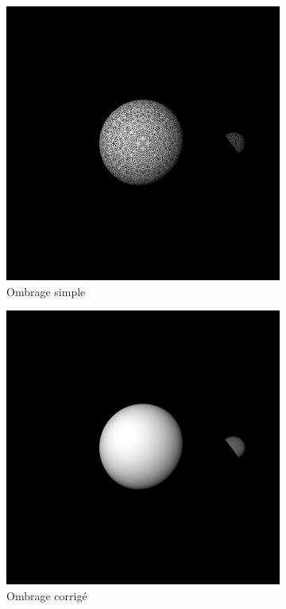 \documentclass[12pt,a4paper,twoside]{report}
\begin{document}
\begin{figure}[H]
	\centering
	\begin{subfigure}{.45\textwidth}
		\centering
		\includegraphics[width=1.\linewidth]{be2_01}
		\caption{Ombrage simple}
		\label{fig:be2_01}
	\end{subfigure}
	\begin{subfigure}{.45\textwidth}
		\centering
		\includegraphics[width=1.\linewidth]{be2_02}
		\caption{Ombrage corrigé}
		\label{fig:be2_02}
	\end{subfigure}
	\caption{}
\end{figure}
\end{document}
